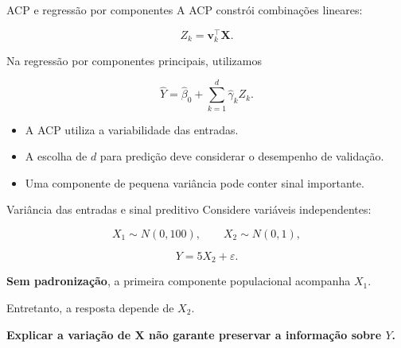 \documentclass[
  10pt,
  ignorenonframetext,
  aspectratio=169,
  brazilian,
]{beamer}
\providecommand{\tightlist}{%
  \setlength{\itemsep}{0pt}\setlength{\parskip}{0pt}}
\begin{document}
\begin{frame}{ACP e regressão por componentes}
\protect{}\label{acp-e-regressuxe3o-por-componentes}
A ACP constrói combinações lineares:

\[
Z_k=\mathbf v_k^\top\mathbf X.
\]

Na regressão por componentes principais, utilizamos

\[
\widehat Y=\hat\beta_0+\sum_{k=1}^{d}\hat\gamma_kZ_k.
\]

\begin{itemize}
\tightlist
\item
  A ACP utiliza a variabilidade das entradas.
\item
  A escolha de \(d\) para predição deve considerar o desempenho de
  validação.
\item
  Uma componente de pequena variância pode conter sinal importante.
\end{itemize}
\end{frame}

\begin{frame}{Variância das entradas e sinal preditivo}
\protect{}\label{variuxe2ncia-das-entradas-e-sinal-preditivo}
Considere variáveis independentes:

\[
X_1\sim N(0,100),\qquad X_2\sim N(0,1),
\]

\[
Y=5X_2+\varepsilon.
\]

\textbf{Sem padronização}, a primeira componente populacional acompanha
\(X_1\).

Entretanto, a resposta depende de \(X_2\).

\textbf{Explicar a variação de \(\mathbf X\) não garante preservar a
informação sobre \(Y\).}

\end{frame}
\end{document}
